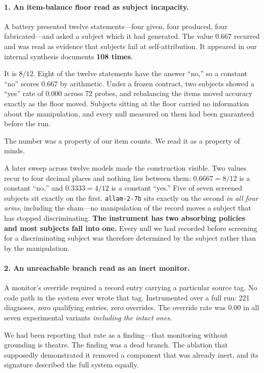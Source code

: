 \documentclass[11pt]{article}
\begin{document}
\paragraph{1. An item-balance floor read as subject incapacity.}
A battery presented twelve statements---four given, four produced, four
fabricated---and asked a subject which it had generated. The value $0.667$
recurred and was read as evidence that subjects fail at self-attribution. It
appeared in our internal synthesis documents \textbf{108 times}.

It is $8/12$. Eight of the twelve statements have the answer ``no,'' so a
constant ``no'' scores $0.667$ by arithmetic. Under a frozen contract, two
subjects showed a ``yes'' rate of $0.000$ across 72 probes, and rebalancing the
items moved accuracy exactly as the floor moved. Subjects sitting at the floor
carried no information about the manipulation, and every null measured on them
had been guaranteed before the run.

The number was a property of our item counts. We read it as a property of
minds.

A later sweep across twelve models made the construction visible. Two values
recur to four decimal places and nothing lies between them:
$0.6667 = 8/12$ is a constant ``no,'' and $0.3333 = 4/12$ is a constant
``yes.'' Five of seven screened subjects sit exactly on the first.
\texttt{allam-2-7b} sits exactly on the second \emph{in all four arms},
including the sham---no manipulation of the record moves a subject that has
stopped discriminating. \textbf{The instrument has two absorbing policies and
most subjects fall into one.} Every null we had recorded before screening for
a discriminating subject was therefore determined by the subject rather than by
the manipulation.

\paragraph{2. An unreachable branch read as an inert monitor.}
A monitor's override required a record entry carrying a particular source tag.
No code path in the system ever wrote that tag. Instrumented over a full run:
221 diagnoses, zero qualifying entries, zero overrides. The override rate was
$0.00$ in all seven experimental variants \emph{including the intact ones}.

We had been reporting that rate as a finding---that monitoring without
grounding is theatre. The finding was a dead branch. The ablation that
supposedly demonstrated it removed a component that was already inert, and its
signature described the full system equally.
\end{document}
